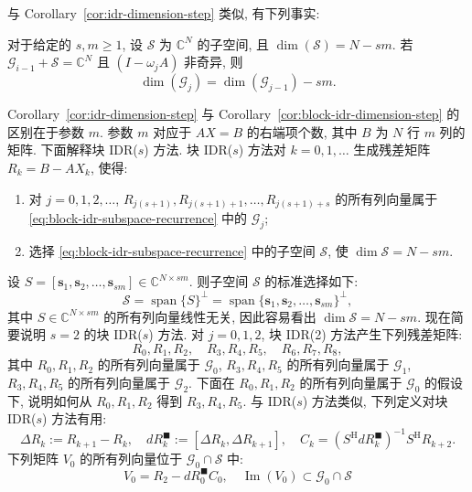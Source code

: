 {与 Corollary\ \ref{cor:idr-dimension-step} 类似, 有下列事实:}
\par{}
\begin{Corollary}\label{cor:block-idr-dimension-step}
{对于给定的 $s,m\ge1$, 设 $\mathcal S$ 为 $\mathbb C^N$ 的子空间, 且 $\dim(\mathcal S)=N-sm$. 若 $\mathcal G_{i-1}+\mathcal S=\mathbb C^N$ 且 $(I-\omega_jA)$ 非奇异, 则}
\[\dim(\mathcal G_j)=\dim(\mathcal G_{j-1})-sm.\]
\end{Corollary}
{Corollary\ \ref{cor:idr-dimension-step} 与 Corollary\ \ref{cor:block-idr-dimension-step} 的区别在于参数 $m$. 参数 $m$ 对应于 $AX=B$ 的右端项个数, 其中 $B$ 为 $N$ 行 $m$ 列的矩阵.}
{下面解释块 IDR($s$) 方法. 块 IDR($s$) 方法对 $k=0,1,\ldots$ 生成残差矩阵 $R_k=B-AX_k$, 使得:}
\begin{enumerate}
\item{对 $j=0,1,2,\ldots$, $R_{j(s+1)},R_{j(s+1)+1},\ldots,R_{j(s+1)+s}$ 的所有列向量属于 \eqref{eq:block-idr-subspace-recurrence} 中的 $\mathcal G_j$;}
\item{选择 \eqref{eq:block-idr-subspace-recurrence} 中的子空间 $\mathcal S$, 使 $\dim\mathcal S=N-sm$.}
\end{enumerate}
{设 $S=[\bm s_1,\bm s_2,\ldots,\bm s_{sm}]\in\mathbb C^{N\times sm}$. 则子空间 $\mathcal S$ 的标准选择如下:}
\[\mathcal S=\operatorname{span}\{S\}^{\perp}=\operatorname{span}\{\bm s_1,\bm s_2,\ldots,\bm s_{sm}\}^{\perp},\]
{其中 $S\in\mathbb C^{N\times sm}$ 的所有列向量线性无关, 因此容易看出 $\dim\mathcal S=N-sm$.}
{现在简要说明 $s=2$ 的块 IDR($s$) 方法. 对 $j=0,1,2$, 块 IDR(2) 方法产生下列残差矩阵:}
\[R_0,R_1,R_2,\quad R_3,R_4,R_5,\quad R_6,R_7,R_8,\]
{其中 $R_0,R_1,R_2$ 的所有列向量属于 $\mathcal G_0$, $R_3,R_4,R_5$ 的所有列向量属于 $\mathcal G_1$, $R_3,R_4,R_5$ 的所有列向量属于 $\mathcal G_2$.}
{下面在 $R_0,R_1,R_2$ 的所有列向量属于 $\mathcal G_0$ 的假设下, 说明如何从 $R_0,R_1,R_2$ 得到 $R_3,R_4,R_5$. 与 IDR($s$) 方法类似, 下列定义对块 IDR($s$) 方法有用:}
\begin{equation}\label{eq:block-idr-residual-differences}\Delta R_k:=R_{k+1}-R_k,\quad dR_k^{\blacksquare}:=[\Delta R_k,\Delta R_{k+1}],\quad C_k=(S^{\mathrm H}dR_k^{\blacksquare})^{-1}S^{\mathrm H}R_{k+2}.\end{equation}
{下列矩阵 $V_0$ 的所有列向量位于 $\mathcal G_0\cap\mathcal S$ 中:}
\[V_0=R_2-dR_0^{\blacksquare}C_0,\quad\operatorname{Im}(V_0)\subset\mathcal G_0\cap\mathcal S\]
